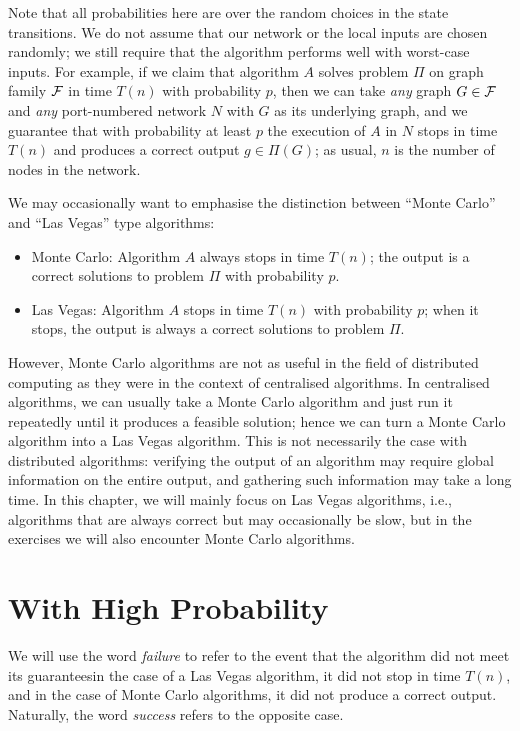 Note that all probabilities here are over the random choices in the state transitions. We do not assume that our network or the local inputs are chosen randomly; we still require that the algorithm performs well with worst-case inputs. For example, if we claim that algorithm $A$ solves problem $\Pi$ on graph family $\mathcal{F}$ in time $T(n)$ with probability $p$, then we can take \emph{any} graph $G \in \mathcal{F}$ and \emph{any} port-numbered network $N$ with $G$ as its underlying graph, and we guarantee that with probability at least $p$ the execution of $A$ in $N$ stops in time $T(n)$ and produces a correct output $g \in \Pi(G)$; as usual, $n$ is the number of nodes in the network.

We may occasionally want to emphasise the distinction between ``Monte Carlo'' and ``Las Vegas'' type algorithms:
\begin{itemize}
    \item Monte Carlo: Algorithm $A$ always stops in time $T(n)$; the output is a correct solutions to problem $\Pi$ with probability $p$.
    \item Las Vegas: Algorithm $A$ stops in time $T(n)$ with probability $p$; when it stops, the output is always a correct solutions to problem $\Pi$.
\end{itemize}
However, Monte Carlo algorithms are not as useful in the field of distributed computing as they were in the context of centralised algorithms. In centralised algorithms, we can usually take a Monte Carlo algorithm and just run it repeatedly until it produces a feasible solution; hence we can turn a Monte Carlo algorithm into a Las Vegas algorithm. This is not necessarily the case with distributed algorithms: verifying the output of an algorithm may require global information on the entire output, and gathering such information may take a long time. In this chapter, we will mainly focus on Las Vegas algorithms, i.e., algorithms that are always correct but may occasionally be slow, but in the exercises we will also encounter Monte Carlo algorithms.


\section{With High Probability}

We will use the word \emph{failure} to refer to the event that the algorithm did not meet its guarantees\mydash in the case of a Las Vegas algorithm, it did not stop in time $T(n)$, and in the case of Monte Carlo algorithms, it did not produce a correct output. Naturally, the word \emph{success} refers to the opposite case.

